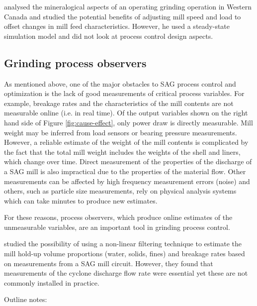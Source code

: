 \cite{liu_development_2018} analysed the mineralogical aspects of an operating grinding operation in Western Canada and studied the potential benefits of adjusting mill speed and load to offset changes in mill feed characteristics. However, he used a steady-state simulation model and did not look at process control design aspects.



\subsection*{Grinding process observers}

As mentioned above, one of the major obstacles to SAG process control and optimization is the lack of good measurements of critical process variables. For example, breakage rates and the characteristics of the mill contents are not measurable online (i.e. in real time). Of the output variables shown on the right hand side of Figure \ref{fig:cause-effect}, only power draw is directly measurable. Mill weight may be inferred from load sensors or bearing pressure measurements. However, a reliable estimate of the weight of the mill contents is complicated by the fact that the total mill weight includes the weights of the shell and liners, which change over time. Direct measurement of the properties of the discharge of a SAG mill is also impractical due to the properties of the material flow.  Other measurements can be affected by high frequency measurement errors (noise) and others, such as particle size measurements, rely on physical analysis systems which can take minutes to produce new estimates.

For these reasons, process observers, which produce online estimates of the unmeasurable variables, are an important tool in grinding process control.  

\cite{le_roux_state_2016} studied the possibility of using a non-linear filtering technique to estimate the mill hold-up volume proportions (water, solids, fines) and breakage rates based on measurements from a SAG mill circuit. However, they found that measurements of the cyclone discharge flow rate were essential yet these are not commonly installed in practice.

Outline notes:

\begin{outline}
\end{outline}

